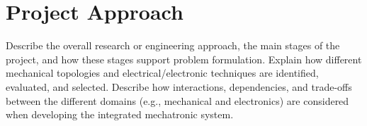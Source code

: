 \section{Project Approach}
Describe the overall research or engineering approach, the main stages of the project, 
and how these stages support problem formulation. Explain how different mechanical 
topologies and electrical/electronic techniques are identified, evaluated, and 
selected. Describe how interactions, dependencies, and trade-offs between the different 
domains (e.g., mechanical and electronics) are considered when developing the integrated 
mechatronic system. 